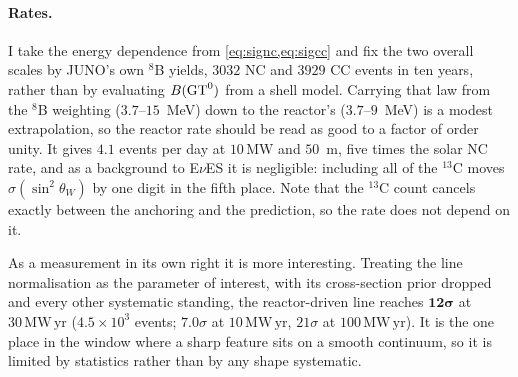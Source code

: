 \documentclass[aps,prd,superscriptaddress,nofootinbib,longbibliography,notitlepage,11pt]{revtex4-2}
\newcommand{\eves}{E$\nu$ES}
\newcommand{\sw}{\sin^2\theta_W}
\newcommand{\MWyr}{\mathrm{MW\,yr}}
\begin{document}
\paragraph{Rates.}
I take the energy dependence from \cref{eq:signc,eq:sigcc} and fix the two overall scales by
JUNO's own $^8$B yields, $3032$ NC and $3929$ CC events in ten years, rather than by
evaluating $B({\rm GT}^0)$ from a shell model.  Carrying that law from the $^8$B weighting
($3.7$--$15$~MeV) down to the reactor's ($3.7$--$9$~MeV) is a modest extrapolation, so the
reactor rate should be read as good to a factor of order unity.  It gives $4.1$ events per
day at $10\,\mathrm{MW}$ and $50$~m, five times the solar NC rate, and as a background to
\eves{} it is negligible: including all of the $^{13}$C moves $\sigma(\sw)$ by one digit in
the fifth place.  Note that the $^{13}$C count cancels exactly between the anchoring and
the prediction, so the rate does not depend on it.

As a measurement in its own right it is more interesting.  Treating the line normalisation
as the parameter of interest, with its cross-section prior dropped and every other
systematic standing, the reactor-driven line reaches $\mathbf{12\sigma}$ at $30\,\MWyr$
($4.5\times10^3$ events; $7.0\sigma$ at $10\,\MWyr$, $21\sigma$ at $100\,\MWyr$).  It is
the one place in the window where a sharp feature sits on a smooth continuum, so it is
limited by statistics rather than by any shape systematic.
\end{document}
